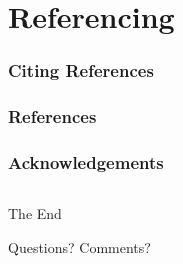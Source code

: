 \documentclass[
  11pt, %
  xcolor=dvipsnames
]{beamer}
\begin{document}

\section{Referencing}

\begin{frame}
	\frametitle{Citing References}

	\bigskip %

\end{frame}


\begin{frame} %
	\frametitle{References}

	\begin{thebibliography}{99} %
		\footnotesize %

	\end{thebibliography}
\end{frame}


\begin{frame}
	\frametitle{Acknowledgements}

	\begin{columns}[t] %
		\begin{column}{0.45\textwidth} %
		\end{column}
		\begin{column}{0.5\textwidth} %
		\end{column}
	\end{columns}
\end{frame}


\begin{frame}[plain] %
	\begin{center}
		{\Huge The End}

		\bigskip\bigskip %

		{\LARGE Questions? Comments?}
	\end{center}
\end{frame}

\end{document}
